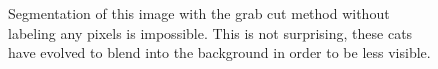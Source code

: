 \documentclass[11pt,a4paper]{article}
\begin{document}
\begin{figure}
\centering
{}


\caption{Segmentation of this image with the grab cut method without labeling any pixels is impossible. This is not surprising, these cats have evolved to blend into the background in order to be less visible.}%

\end{figure}
\end{document}
